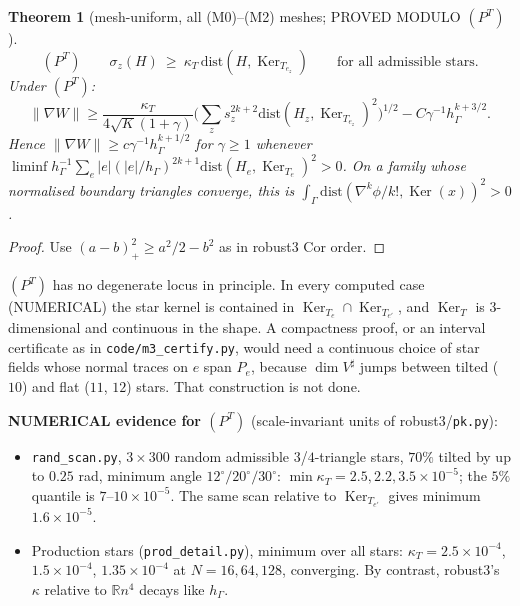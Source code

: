 \documentclass[11pt]{article}
\newtheorem{theorem}{Theorem}[section]
\theoremstyle{remark}
\newcommand{\hG}{h_\Gamma}
\begin{document}
\begin{theorem}[mesh-uniform, all (M0)--(M2) meshes; PROVED MODULO $(P^T)$]\label{thm:PT}
\[
(P^T)\qquad\sigma_z(H)\ \ge\ \kappa_T\,\mathrm{dist}(H,\operatorname{Ker}_{T_{e_z}})\qquad\text{for all admissible stars}.
\]
Under $(P^T)$:
\[
\|\nabla W\|\ge\frac{\kappa_T}{4\sqrt K(1+\gamma)}\Big(\sum_z s_z^{2k+2}\mathrm{dist}(H_z,\operatorname{Ker}_{T_{e_z}})^2\Big)^{1/2}
-C\gamma^{-1}\hG^{k+3/2}.
\]
Hence $\|\nabla W\|\ge c\gamma^{-1}\hG^{k+1/2}$ for $\gamma\ge1$ whenever
$\liminf\hG^{-1}\sum_e|e|(|e|/\hG)^{2k+1}\mathrm{dist}(H_e,\operatorname{Ker}_{T_e})^2>0$. On a family whose normalised boundary
triangles converge, this is $\int_\Gamma\mathrm{dist}(\nabla^k\phi/k!,\operatorname{Ker}(x))^2>0$.
\end{theorem}
\begin{proof}
Use $(a-b)_+^2\ge a^2/2-b^2$ as in robust3 Cor order.
\end{proof}
$(P^T)$ has no degenerate locus in principle. In every computed case (NUMERICAL) the star kernel is contained in $\operatorname{Ker}_{T_e}\cap\operatorname{Ker}_{T_{e'}}$,
and $\operatorname{Ker}_T$ is $3$-dimensional and continuous in the shape. A compactness proof, or an interval certificate as in
\texttt{code/m3\_certify.py}, would need a continuous choice of star fields whose normal traces on $e$ span $P_e$, because
$\dim V^\sharp$ jumps between tilted ($10$) and flat ($11$, $12$) stars. That construction is not done.

\noindent\textbf{NUMERICAL evidence for $(P^T)$} (scale-invariant units of robust3/\texttt{pk.py}):
\begin{itemize}
\item \texttt{rand\_scan.py}, $3\times300$ random admissible $3$/$4$-triangle stars, $70\%$ tilted by up to $0.25$ rad, minimum
angle $12^\circ/20^\circ/30^\circ$: $\min\kappa_T=2.5,2.2,3.5\times10^{-5}$; the $5\%$ quantile is $7$--$10\times10^{-5}$. The same scan relative to
$\operatorname{Ker}_{T_{e'}}$ gives minimum $1.6\times10^{-5}$.
\item Production stars (\texttt{prod\_detail.py}), minimum over all stars: $\kappa_T=2.5\times10^{-4}$, $1.5\times10^{-4}$,
$1.35\times10^{-4}$ at $N=16,64,128$, converging. By contrast, robust3's $\kappa$ relative to $\mathbb Rn^4$ decays like $\hG$.
\end{itemize}
\end{document}
